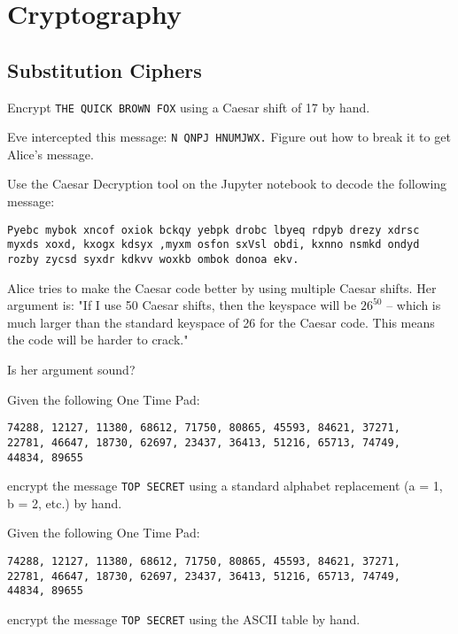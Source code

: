 \documentclass[11pt,a4paper]{report}
\begin{document}
\section{Cryptography}

\subsection{Substitution Ciphers}

\begin{ex}
Encrypt \verb|THE QUICK BROWN FOX| using a Caesar shift of 17 by hand.
\end{ex}


\begin{ex}
Eve intercepted this message: \verb|N QNPJ HNUMJWX.| Figure out how to break it to get Alice’s message.
\end{ex}


\begin{ex}
Use the Caesar Decryption tool on the Jupyter notebook to decode the following message:
\begin{verbatim}
Pyebc mybok xncof oxiok bckqy yebpk drobc lbyeq rdpyb drezy xdrsc
myxds xoxd, kxogx kdsyx ,myxm osfon sxVsl obdi, kxnno nsmkd ondyd
rozby zycsd syxdr kdkvv woxkb ombok donoa ekv.
\end{verbatim}
\end{ex}

\begin{ex}
Alice tries to make the Caesar code better by using multiple Caesar shifts. Her argument is: "If I use 50 Caesar shifts,  then the keyspace will be $26^{50}$ -- which is much larger than the standard keyspace of 26 for the Caesar code.  This means the code will be harder to crack." 

Is her argument sound?
\end{ex}

\begin{ex}
Given the following One Time Pad: 
\begin{verbatim}
74288, 12127, 11380, 68612, 71750, 80865, 45593, 84621, 37271,
22781, 46647, 18730, 62697, 23437, 36413, 51216, 65713, 74749,
44834, 89655
\end{verbatim}
encrypt the message \verb|TOP SECRET| using a standard alphabet replacement (a = 1, b = 2, etc.) by hand.
\end{ex}

\begin{ex}
Given the following One Time Pad: 
\begin{verbatim}
74288, 12127, 11380, 68612, 71750, 80865, 45593, 84621, 37271,
22781, 46647, 18730, 62697, 23437, 36413, 51216, 65713, 74749,
44834, 89655
\end{verbatim}
encrypt the message \verb|TOP SECRET| using the ASCII table by hand.
\end{ex}
\end{document}
